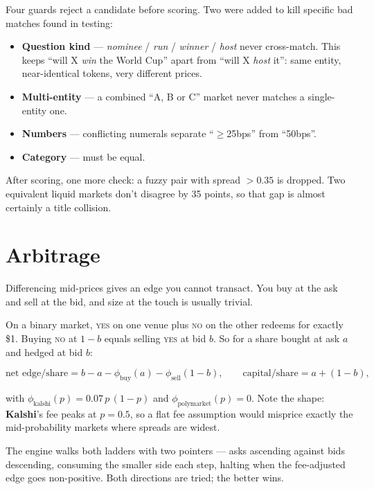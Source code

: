 \documentclass[11pt,a4paper]{article}
\newcommand{\KS}{{\color{kalshi}\textbf{Kalshi}}}
\begin{document}
Four guards reject a candidate before scoring. Two were added to kill specific bad matches
found in testing:

\begin{itemize}
  \item \textbf{Question kind} --- \emph{nominee} / \emph{run} / \emph{winner} / \emph{host}
        never cross-match. This keeps ``will X \emph{win} the World Cup'' apart from ``will X
        \emph{host} it'': same entity, near-identical tokens, very different prices.
  \item \textbf{Multi-entity} --- a combined ``A, B or C'' market never matches a single-entity
        one.
  \item \textbf{Numbers} --- conflicting numerals separate ``$\geq$25bps'' from ``50bps''.
  \item \textbf{Category} --- must be equal.
\end{itemize}

After scoring, one more check: a fuzzy pair with spread $> 0.35$ is dropped. Two equivalent
liquid markets don't disagree by 35 points, so that gap is almost certainly a title collision.

\section{Arbitrage}
\label{sec:arb}

Differencing mid-prices gives an edge you cannot transact. You buy at the ask and sell at the
bid, and size at the touch is usually trivial.

On a binary market, \textsc{yes} on one venue plus \textsc{no} on the other redeems for exactly
\$1. Buying \textsc{no} at $1-b$ equals selling \textsc{yes} at bid $b$. So for a share bought
at ask $a$ and hedged at bid $b$:

\begin{equation}
\text{net edge/share} = b - a - \phi_{\text{buy}}(a) - \phi_{\text{sell}}(1-b),
\qquad
\text{capital/share} = a + (1-b),
\end{equation}

with $\phi_{\text{kalshi}}(p) = 0.07\,p\,(1-p)$ and $\phi_{\text{polymarket}}(p) = 0$. Note the
shape: \KS{}'s fee peaks at $p = 0.5$, so a flat fee assumption would misprice exactly the
mid-probability markets where spreads are widest.

The engine walks both ladders with two pointers --- asks ascending against bids descending,
consuming the smaller side each step, halting when the fee-adjusted edge goes non-positive.
Both directions are tried; the better wins.
\end{document}
